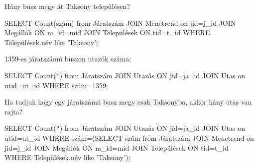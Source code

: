 \documentclass[12pt]{article}
\begin{document}
Hány busz megy át Taksony településen?
\begin{spverbatim}
SELECT Count(szám) from Járatszám JOIN Menetrend on jid=j_id JOIN Megállók ON m_id=mid JOIN Települések ON tid=t_id WHERE Települések.név like 'Taksony';
\end{spverbatim}
1359-es járatszámú buszon utazók száma:
\begin{spverbatim}
SELECT Count(*) from Járatszám JOIN Utazás ON jid=ja_id JOIN Utas on utid=ut_id WHERE szám=1359;
\end{spverbatim}
Ha tudjuk hogy egy járatszámú busz megy csak Taksonyba, akkor hány utas van rajta?
\begin{spverbatim}
SELECT Count(*) from Járatszám JOIN Utazás ON jid=ja_id JOIN Utas on utid=ut_id WHERE szám=(SELECT szám from Járatszám JOIN Menetrend on jid=j_id JOIN Megállók ON m_id=mid JOIN Települések ON tid=t_id WHERE Települések.név like 'Taksony');
\end{spverbatim}
\end{document}
